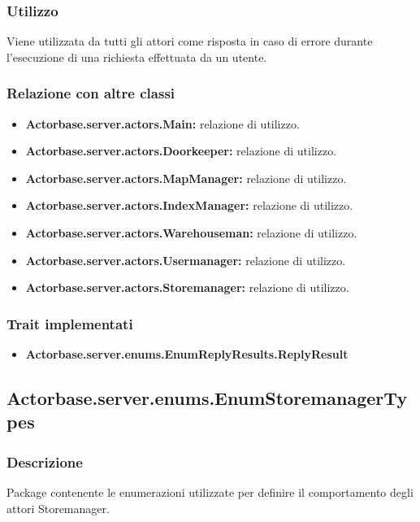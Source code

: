 \documentclass[a4paper]{article}
\begin{document}
			\subsubsection{Utilizzo}
				Viene utilizzata da tutti gli attori come risposta in caso di errore durante l'esecuzione di una richiesta effettuata da un utente.
				
			\subsubsection{Relazione con altre classi}
				\begin{itemize}
					\item \textbf{Actorbase.server.actors.Main:} relazione di utilizzo.
					\item \textbf{Actorbase.server.actors.Doorkeeper:} relazione di utilizzo.
					\item \textbf{Actorbase.server.actors.MapManager:} relazione di utilizzo.
					\item \textbf{Actorbase.server.actors.IndexManager:} relazione di utilizzo.
					\item \textbf{Actorbase.server.actors.Warehouseman:} relazione di utilizzo.
					\item \textbf{Actorbase.server.actors.Usermanager:} relazione di utilizzo.
					\item \textbf{Actorbase.server.actors.Storemanager:} relazione di utilizzo.
				\end{itemize}
				
			\subsubsection{Trait implementati}
				\begin{itemize}
					\item \textbf{Actorbase.server.enums.EnumReplyResults.ReplyResult} 
				\end{itemize}
				
	
				\subsection{Actorbase.server.enums.EnumStoremanagerTypes}
			\subsubsection{Descrizione}
				Package contenente le enumerazioni utilizzate per definire il comportamento degli attori Storemanager.
				
\end{document}
